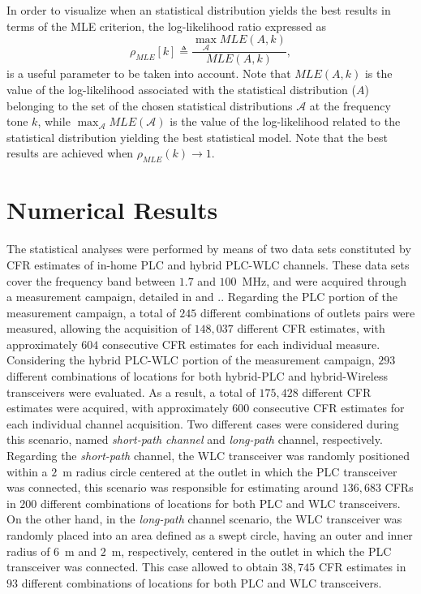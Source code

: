 \documentclass[journal]{IEEEtran}
\begin{document}
In order to visualize when an statistical distribution yields the best results in terms of the \ac{MLE} criterion, the log-likelihood ratio expressed as
\begin{equation}
\rho_{MLE} [k] \triangleq \dfrac{\max_{\mathcal{A}} MLE(A,k)}{MLE(A,k )},
\label{eq:log-lik}
\end{equation}
is a useful parameter to be taken into account. Note that $ MLE(A,k)$ is the value of the log-likelihood associated with the statistical distribution ($A$) belonging to the set of the chosen statistical distributions $\mathcal{A}$ at the frequency tone $k$, while $\max_{\mathcal{A}} MLE(\mathcal{A})$ is the value of the log-likelihood related to the statistical distribution yielding the best statistical model. Note that the best results are achieved when $\rho_{MLE} (k) \rightarrow 1$.

\section{Numerical Results}

The statistical analyses were performed by means of two data sets constituted by \ac{CFR} estimates of in-home \ac{PLC} and hybrid \ac{PLC}-\ac{WLC} channels. These data sets cover the frequency band between $1.7$ and $100$~MHz, and were acquired through a measurement campaign, detailed in \cite{Thiago:Characterization} and \cite{thiago:hyb}.. Regarding the \ac{PLC} portion of the measurement campaign, a total of $245$ different combinations of outlets pairs were measured, allowing the acquisition of $148,037$ different \ac{CFR} estimates, with approximately $604$ consecutive \ac{CFR} estimates for each individual measure. Considering the hybrid \ac{PLC}-\ac{WLC} portion of the measurement campaign, $293$ different combinations of locations for both hybrid-\ac{PLC} and hybrid-Wireless transceivers were evaluated. As a result, a total of $175,428$ different \ac{CFR} estimates were acquired, with approximately $600$ consecutive \ac{CFR} estimates for each individual channel acquisition. Two different cases were considered during this scenario, named \textit{short-path channel} and \textit{long-path} channel, respectively. Regarding the \textit{short-path} channel, the \ac{WLC} transceiver was randomly positioned within a $2$~m radius circle centered at the outlet in which the \ac{PLC} transceiver was connected, this scenario was responsible for estimating around $136,683$ \acp{CFR} in $200$ different combinations of locations for both \ac{PLC} and \ac{WLC} transceivers. On the other hand, in the \textit{long-path} channel scenario, the \ac{WLC} transceiver was randomly placed into an area defined as a swept circle, having an outer and inner radius of $6$~m and $2$~m, respectively, centered in the outlet in which the \ac{PLC} transceiver was connected. This case allowed to obtain $38,745$ \ac{CFR} estimates in $93$ different combinations of locations for both \ac{PLC} and \ac{WLC} transceivers.
\end{document}
